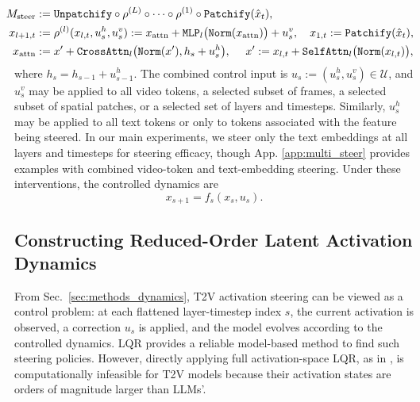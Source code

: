 \documentclass{article}
\begin{document}
\begin{subequations}\label{eq:steered_transformer}
\begin{align}
    \hspace{-8pt}M_{\mathrm{steer}}
    &:=
    \texttt{Unpatchify}
    \circ
    \rho^{(L)}
    \circ \cdots \circ
    \rho^{(1)}
    \circ
    \texttt{Patchify}(\hat x_t),
    \label{eq:steered_transformer_M}
    \\
    \hspace{-8pt}x_{l+1,t}%
    &:=
    \rho^{(l)}(x_{l,t},u_s^h,u_s^v)
    :=
    x_{\mathrm{attn}}
    +
    \texttt{MLP}_l
    \bigl(
        \texttt{Norm}(x_{\mathrm{attn}})
    \bigr)
    +
    u_s^v, \quad x_{1,t}:= \texttt{Patchify}(\hat x_t),
    \label{eq:steered_transformer_dynamics}
    \\
    \hspace{-8pt}x_{\mathrm{attn}}
    &:=
    x'
    +
    \texttt{CrossAttn}_l
    \bigl(
        \texttt{Norm}(x'),
        h_s + u_s^h
    \bigr),
    \quad\
    x'
    :=
    x_{l,t}
    +
    \texttt{SelfAttn}_l
    \bigl(
        \texttt{Norm}(x_{l,t})
    \bigr),
    \label{eq:steered_transformer_z}
\end{align}
\end{subequations}
where $h_s = h_{s-1}+u_{s-1}^h$. The combined control input is $u_s := (u_s^h,u_s^v) \in \mathcal{U}$, and $u_s^v$ may be applied to all video tokens, a selected subset of frames, a selected subset of spatial patches, or a selected set of layers and timesteps. Similarly, $u_s^h$ may be applied to all text tokens or only to tokens associated with the feature being steered. In our main experiments, we steer only the text embeddings at all layers and timesteps for steering efficacy, though App. \ref{app:multi_steer} provides examples with combined video-token and text-embedding steering.
Under these interventions, the controlled dynamics are
\begin{equation}\label{eq:controlled_dynamics}
    x_{s+1}
    =
    f_s(x_s,u_s).
\end{equation}


\vspace{-8pt}
\subsection{Constructing Reduced-Order Latent Activation Dynamics}
\label{subsec:latentactivationdynamics}
\vspace{-5pt}

From Sec.~\ref{sec:methods_dynamics}, T2V activation steering can be viewed as a control problem: at each flattened layer-timestep index $s$, the current activation is observed, a correction $u_s$ is applied, and the model evolves according to the controlled dynamics. LQR provides a reliable model-based method to find such steering policies. However, directly applying full activation-space LQR, as in \cite{skifstad2026local}, is computationally infeasible for T2V models because their activation states are orders of magnitude larger than LLMs'.
\end{document}
